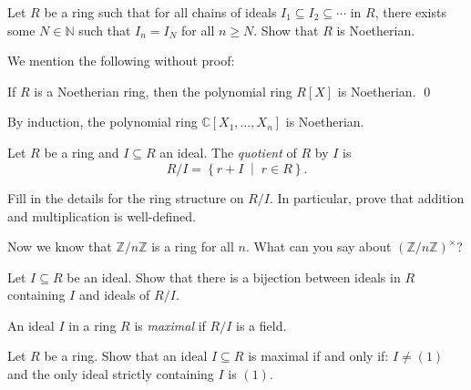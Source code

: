 \documentclass[a4paper,11pt]{article}
\begin{document}
    \begin{exercise}
      Let \(R\) be a ring such that for all chains of ideals \(I_1 \subseteq I_2 \subseteq \cdots\) in \(R\), there exists some \(N \in \mathbb{N}\) such that \(I_n = I_N\) for all \(n \ge N\). Show that \(R\) is Noetherian.
    \end{exercise}

    We mention the following without proof:

    \begin{theorem}
      If \(R\) is a Noetherian ring, then the polynomial ring \(R[X]\) is Noetherian. \qed
    \end{theorem}

    \begin{example}
      By induction, the polynomial ring \(\mathbb{C}[X_1, \dots, X_n]\) is Noetherian.
    \end{example}

    \begin{definition}
      Let \(R\) be a ring and \(I \subseteq R\) an ideal. The \emph{quotient} of \(R\) by \(I\) is
      \[
        R/I = \left\{ r + I \; \middle| \; r \in R \right\}.
      \]
    \end{definition}

    \begin{exercise}
      Fill in the details for the ring structure on \(R/I\). In particular, prove that addition and multiplication is well-defined.
    \end{exercise}

    \begin{exercise}
      Now we know that \(\mathbb{Z}/n \mathbb{Z}\) is a ring for all \(n\). What can you say about \((\mathbb{Z}/n \mathbb{Z})^\times\)?
    \end{exercise}

    \begin{exercise}
      Let \(I \subseteq R\) be an ideal. Show that there is a bijection between ideals in \(R\) containing \(I\) and ideals of \(R/I\).
    \end{exercise}

    \begin{definition}
      An ideal \(I\) in a ring \(R\) is \emph{maximal} if \(R/I\) is a field.
    \end{definition}

    \begin{exercise}
      Let \(R\) be a ring. Show that an ideal \(I \subseteq R\) is maximal if and only if: \(I \ne (1)\) and the only ideal strictly containing \(I\) is \((1)\).
    \end{exercise}
\end{document}

